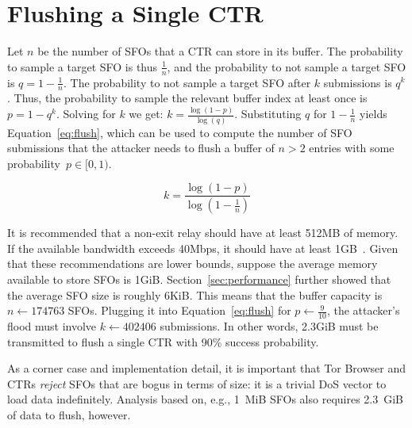 \section{Flushing a Single CTR} \label{app:flush}
Let $n$ be the number of SFOs that a CTR can store in its buffer.  The
probability to sample a target SFO is thus $\frac{1}{n}$, and the probability to
not sample a target SFO is $q = 1 - \frac{1}{n}$.  The probability to not sample
a target SFO after $k$ submissions is $q^k$.  Thus, the probability to sample
the relevant buffer index at least once is $p = 1 - q^k$.  Solving for $k$ we
get: $k = \frac{\log(1 - p)}{\log(q)}$.  Substituting $q$ for $1 - \frac{1}{n}$
yields Equation~\ref{eq:flush}, which can be used to compute the number of
SFO submissions that the attacker needs to flush a buffer of $n>2$
entries with some probability~$p\in[0,1)$.

\begin{equation} \label{eq:flush}
	k = \frac{\log(1-p)}{\log(1 - \frac{1}{n})}
\end{equation}

It is recommended that a non-exit relay should have at least 512MB of memory.
If the available bandwidth exceeds 40Mbps, it should have at least
1GB~\cite{relay-config}.  Given that these recommendations are lower bounds,
suppose the average memory available to store SFOs is 1GiB.
Section~\ref{sec:performance} further showed that the average SFO size is
roughly 6KiB.  This means that the buffer capacity is $n \gets 174763$ SFOs.
Plugging it into Equation~\ref{eq:flush} for $p \gets \frac{9}{10}$, the
attacker's flood must involve $k \gets 402406$ submissions.  In other words,
2.3GiB must be transmitted to flush a single CTR with 90\% success probability.

As a corner case and implementation detail, it is important that Tor Browser and
CTRs \emph{reject} SFOs that are bogus in terms of size: it is a trivial DoS
vector to load data indefinitely. Analysis based on, e.g., 1~MiB SFOs also
requires 2.3~GiB of data to flush, however.
